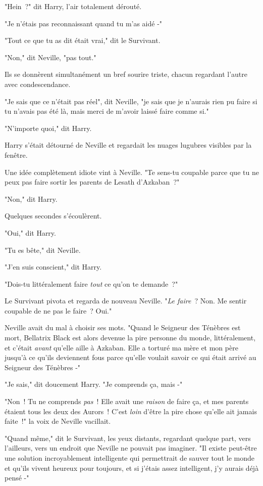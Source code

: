"Hein~?" dit Harry, l'air totalement dérouté.

"Je n'étais pas reconnaissant quand tu m'as aidé -"

"Tout ce que tu as dit était vrai," dit le Survivant.

"Non," dit Neville, "pas tout."

Ils se donnèrent simultanément un bref sourire triste, chacun regardant l'autre avec condescendance.

"Je sais que ce n'était pas réel", dit Neville, "je sais que je n'aurais rien pu faire si tu n'avais pas été là, mais merci de m'avoir laissé faire comme si."

"N'importe quoi," dit Harry.

Harry s'était détourné de Neville et regardait les nuages lugubres visibles par la fenêtre.

Une idée complètement idiote vint à Neville. "Te sens-tu coupable parce que tu ne peux pas faire sortir les parents de Lesath d'Azkaban~?"

"Non," dit Harry.

Quelques secondes s'écoulèrent.

"Oui," dit Harry.

"Tu es bête," dit Neville.

"J'en suis conscient," dit Harry.

"Dois-tu littéralement faire \emph{tout} ce qu'on te demande~?"

Le Survivant pivota et regarda de nouveau Neville. "\emph{Le faire}~? Non. Me sentir coupable de ne pas le faire~? Oui."

Neville avait du mal à choisir ses mots. "Quand le Seigneur des Ténèbres est mort, Bellatrix Black est alors devenue la pire personne du monde, littéralement, et c'était \emph{avant} qu'elle aille à Azkaban. Elle a torturé ma mère et mon père jusqu'à ce qu'ils deviennent fous parce qu'elle voulait savoir ce qui était arrivé au Seigneur des Ténèbres -"

"Je sais," dit doucement Harry. "Je comprends ça, mais -"

"Non~! Tu ne comprends \emph{pas}~! Elle avait une \emph{raison} de faire ça, et mes parents étaient tous les deux des Aurors~! C'est \emph{loin} d'être la pire chose qu'elle ait jamais faite~!" la voix de Neville vacillait.

"Quand même," dit le Survivant, les yeux distants, regardant quelque part, vers l'ailleurs, vers un endroit que Neville ne pouvait pas imaginer. "Il existe peut-être une solution incroyablement intelligente qui permettrait de sauver tout le monde et qu'ils vivent heureux pour toujours, et si j'étais assez intelligent, j'y aurais déjà pensé -"


